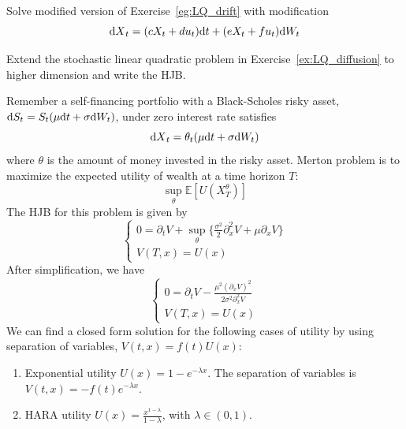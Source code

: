 \documentclass[11pt]{book}
\newcommand{\dd}{\text{\normalfont d}}
\newcommand{\dt}{\text{\normalfont d}t}
\newcommand{\dX}{\text{\normalfont d}X}
\newcommand{\dW}{\text{\normalfont d}W}
\begin{document}
\begin{ex}\label{ex:LQ_diffusion}
Solve modified version of Exercise~\ref{eg:LQ_drift} with modification 
\begin{equation}
        {\dX}_t=(cX_t+du_t){{\dt}}+(eX_t+fu_t) \dW_t
    \end{equation}
\end{ex}
\begin{ex}
    Extend the stochastic linear quadratic problem in Exercise~\ref{ex:LQ_diffusion} to higher dimension and write the HJB.
\end{ex}
\begin{eg}
    {}
    Remember a self-financing portfolio with a 
    Black-Scholes risky asset, 
    ${{\dd}}S_t=S_t(\mu {{\dt}}+\sigma \dW_t)$, 
    under zero interest rate  satisfies
    \begin{equation}
        {\dX}_t=\theta_t(\mu {{\dt}}+ \sigma \dW_t)
    \end{equation}
    where $\theta$ is the amount of money invested in the risky asset.
    Merton problem is to maximize the expected utility of wealth at a time horizon $T$:
    \begin{equation}
        \sup_{\theta}\mathbb{E}[U(X_T^\theta)]
    \end{equation}
    The HJB for this problem is given by 
    \begin{equation}
        \begin{cases}
            0=\partial_t V + \sup_{\theta}\Big\{
            \frac{\sigma^2}{2}\partial^2_x V +\mu \partial_x V\Big\}\\
            V(T,x)=U(x)
        \end{cases}
    \end{equation}
    After simplification, we have 
        \begin{equation}
        \begin{cases}
            0=\partial_t V -\frac{\mu^2 (\partial_x V)^2}{2\sigma^2\partial^2_x V}\\
            V(T,x)=U(x)
        \end{cases}
    \end{equation}
    We can find a closed form solution for the following cases of utility by using separation of variables, $V(t,x)=f(t)U(x)$:
    \begin{enumerate}
        \item Exponential utility $U(x)=1-e^{-\lambda x}$. The separation of variables is $V(t,x)=-f(t)e^{-\lambda x}$.
        \item HARA utility $U(x)=\frac{x^{1-\lambda}}{1-\lambda}$, with $\lambda\in(0,1)$.
    \end{enumerate}
\end{eg}
\end{document}
